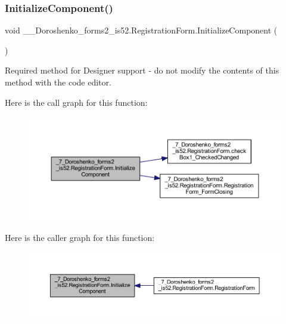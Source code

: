 \subsubsection{\texorpdfstring{Initialize\+Component()}{InitializeComponent()}}
{\footnotesize\ttfamily void \+\_\+\_\+\+Doroshenko\+\_\+forms2\+\_\+is52.\+Registration\+Form.\+Initialize\+Component (\begin{DoxyParamCaption}{ }\end{DoxyParamCaption})\hspace{0.3cm}{\ttfamily [private]}}



Required method for Designer support -\/ do not modify the contents of this method with the code editor. 

Here is the call graph for this function\+:
\nopagebreak
\begin{figure}[H]
\begin{center}
\leavevmode
\includegraphics[width=350pt]{class__7___doroshenko__forms2__is52_1_1_registration_form_a0fe750fb526e69ebe4b83165857d91bf_cgraph}
\end{center}
\end{figure}
Here is the caller graph for this function\+:
\nopagebreak
\begin{figure}[H]
\begin{center}
\leavevmode
\includegraphics[width=350pt]{class__7___doroshenko__forms2__is52_1_1_registration_form_a0fe750fb526e69ebe4b83165857d91bf_icgraph}
\end{center}
\end{figure}
\hypertarget{class__7___doroshenko__forms2__is52_1_1_registration_form_acbf3a620ac8cab4171de994132465912}{}\label{class__7___doroshenko__forms2__is52_1_1_registration_form_acbf3a620ac8cab4171de994132465912} 

